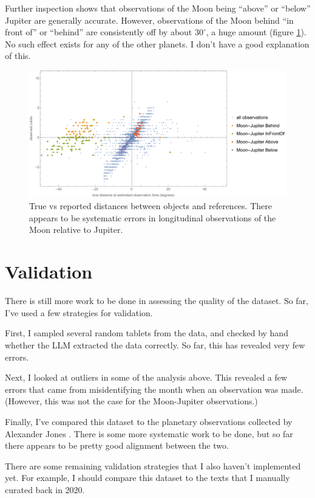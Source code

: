 \documentclass{article}
\begin{document}
Further inspection shows that observations of the Moon being ``above'' or ``below'' Jupiter are generally accurate. However, observations of the Moon behind ``in front of'' or ``behind'' are consistently off by about $30^\circ$, a huge amount (figure \ref{fig:jupiterOutliers}). No such effect exists for any of the other planets. I don't have a good explanation of this.

\begin{figure}[h!]
    \centering
    \includegraphics[width=0.8\linewidth]{jupiterOutliers.pdf}
    \caption{True vs reported distances between objects and references. There appears to be systematic errors in longitudinal observations of the Moon relative to Jupiter.}
    \label{fig:jupiterOutliers}
\end{figure}

\section{Validation}
There is still more work to be done in assessing the quality of the dataset. So far, I've used a few strategies for validation.

First, I sampled several random tablets from the data, and checked by hand whether the LLM extracted the data correctly. So far, this has revealed very few errors.

Next, I looked at outliers in some of the analysis above. This revealed a few errors that came from misidentifying the month when an observation was made. (However, this was not the case for the Moon-Jupiter observations.)

Finally, I've compared this dataset to the planetary observations collected by Alexander Jones \autocite{jones}. There is some more systematic work to be done, but so far there appears to be pretty good alignment between the two.

There are some remaining validation strategies that I also haven't implemented yet. For example, I should compare this dataset to the texts that I manually curated back in 2020.
\end{document}
